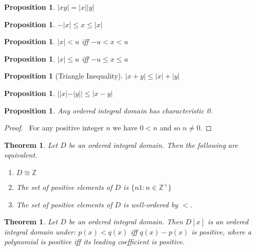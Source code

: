 \documentclass{article}
\let\qed\relax
\newtheorem{proposition}[axiom]{Proposition}
\newtheorem{theorem}[axiom]{Theorem}
\theoremstyle{definition}
\begin{document}
    \begin{proposition}
        $|xy| = |x||y|$
    \end{proposition}

    \begin{proposition}
        $-|x| \leq x \leq |x|$
    \end{proposition}

    \begin{proposition}
        $|x| < u$ iff $-u < x < u$
    \end{proposition}

    \begin{proposition}
        $|x| \leq u$ iff $-u \leq x \leq u$
    \end{proposition}

    \begin{proposition}[Triangle Inequality]
        $|x + y| \leq |x| + |y|$
    \end{proposition}

    \begin{proposition}
        $||x| - |y|| \leq |x-y|$
    \end{proposition}

    \begin{proposition}
        Any ordered integral domain has characteristic 0.
    \end{proposition}

    \begin{proof}
        \pf\ For any positive integer $n$ we have $0 < n$ and so $n \neq 0$. \qed
    \end{proof}

    \begin{theorem}
        Let $D$ be an ordered integral domain. Then the following are equivalent.
        \begin{enumerate}
            \item $D \cong \mathbb{Z}$
            \item The set of positive elements of $D$ is $\{ n1 : n \in \mathbb{Z}^+ \}$
            \item The set of positive elements of $D$ is well-ordered by $<$.
        \end{enumerate}
    \end{theorem}

    \begin{theorem}
        Let $D$ be an ordered integral domain. Then $D[x]$ is an ordered integral domain under:
        $p(x) < q(x)$ iff $q(x) - p(x)$ is positive, where a polynomial is positive iff its leading
        coefficient is positive.
    \end{theorem}
    
\end{document}
